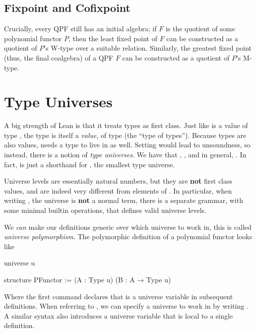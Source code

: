 \subsection*{Fixpoint and Cofixpoint}
Crucially, every QPF still has an initial algebra; if $F$ is the quotient of some polynomial functor
$P$, then the least fixed point of $F$ can be constructed as a quotient of $P$'s W-type over a suitable
relation.
Similarly, the greatest fixed point (thus, the final coalgebra) of a QPF $F$ can be constructed as
a quotient of $P$'s M-type.









\section{Type Universes}
\label{sec:bg:universes}

A big strength of Lean is that it treats types as first class. Just like  is a value of type , the type  is itself a \emph{value}, of type \Type{} (the ``type of types''). Because types are also values, \Type{} needs a type to live in as well. Setting  would lead to unsoundness, so instead, there is a notion of \emph{type universes}. We have that , , and in general, . In fact,  is just a shorthand for , the smallest type universe.

Universe levels are essentially natural numbers, but they are \textbf{not} first class values, and are indeed very different from elements of .
In particular, when writing , the universe  is \textbf{not} a normal term, there is a separate grammar, with some minimal builtin operations, that defines valid universe levels.

We \emph{can} make our definitions generic over which universe to work in, this is called \emph{universe polymorphism}. The polymorphic definition of a polynomial functor looks like
\begin{leancode}
    universe u

    structure PFunctor := (A : Type u) (B : A → Type u)
\end{leancode}
Where the first command declares that  is a universe variable in subsequent definitions.
When referring to , we can specify a universe to work in by writing . A similar syntax also introduces a universe variable that is local to a single definition.

